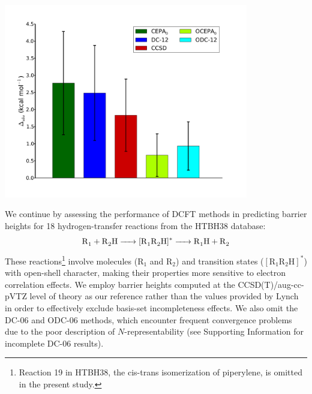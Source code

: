 {\begin{landscape}
\begin{tabular}{lcrrrrrr}
            \hline
            \hline
        \end{tabular}
        \vspace*{\fill}
    \end{landscape}
    \newpage
    \includegraphics[width=0.8\textwidth]{figures/htbh.pdf}
}

We continue by assessing the performance of DCFT methods in predicting barrier
heights for 18 hydrogen-transfer reactions from the HTBH38
database:\cite{Zhao:2005p43}
\begin{equation}
    \ce{R1 + R2H -> [R1R2H]^* -> R1H + R2}
\end{equation}
These reactions\footnote{Reaction 19 in HTBH38, the cis-trans isomerization of
piperylene, is omitted in the present study.} involve molecules ($\mathrm{R_1}$
and $\mathrm{R_2}$) and transition states ($\mathrm{[R_1R_2H]^*}$) with
open-shell character, making their properties more sensitive to electron
correlation effects. 
We employ barrier heights computed at the CCSD(T)/aug-cc-pVTZ level of theory as
our reference rather than the values provided by Lynch\cite{MN-Database} in
order to effectively exclude basis-set incompleteness effects. We also omit the
DC-06 and ODC-06 methods, which encounter frequent convergence problems due to
the poor description of $N$-representability (see Supporting Information for
incomplete DC-06 results).


